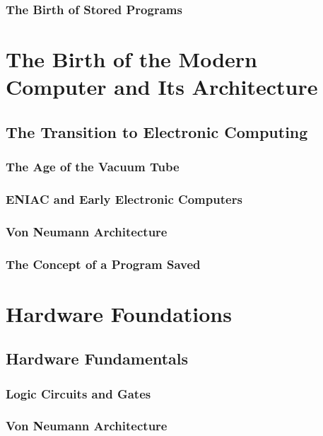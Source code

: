 \documentclass[12pt, oneside]{book}
\begin{document}
	\subsection{The Birth of Stored Programs}
	
	\chapter{The Birth of the Modern Computer and Its Architecture}
	\section{The Transition to Electronic Computing}
	
	\subsection{The Age of the Vacuum Tube}
	
	\subsection{ENIAC and Early Electronic Computers}
	
	\subsection{Von Neumann Architecture}
	
	\subsection{The Concept of a Program Saved}
	
	\chapter{Hardware Foundations}
	\section{Hardware Fundamentals}
	
	\subsection{Logic Circuits and Gates}
	
	\subsection{Von Neumann Architecture}
	
\end{document}
